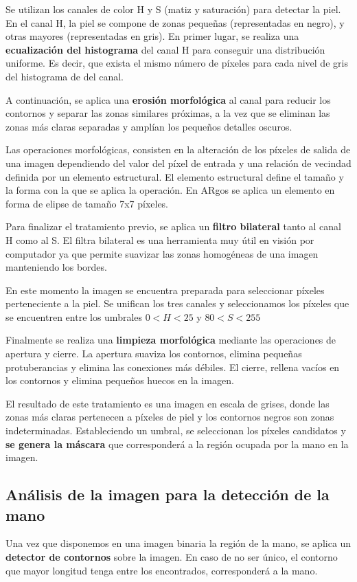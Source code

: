Se utilizan los canales de color H y S (matiz y saturación) para
detectar la piel. En el canal H, la piel se compone de zonas pequeñas
(representadas en negro), y otras mayores (representadas en gris). En
primer lugar, se realiza una \textbf{ecualización del histograma} del canal H
para conseguir una distribución uniforme. Es decir, que exista el
mismo número de píxeles para cada nivel de gris del histograma de del
canal.

A continuación, se aplica una \textbf{erosión morfológica} al canal para reducir los
contornos y separar las zonas similares próximas, a la vez que se
eliminan las zonas más claras separadas y amplían los pequeños detalles
oscuros.

Las operaciones morfológicas, consisten en la alteración de los píxeles
de salida de una imagen dependiendo del valor del píxel de entrada y
una relación de vecindad definida por un elemento estructural. El
elemento estructural define el tamaño y la forma con la que se aplica
la operación. En ARgos se aplica un elemento en forma de elipse de
tamaño 7x7 píxeles.

Para finalizar el tratamiento previo, se aplica un \textbf{filtro bilateral}
tanto al canal H como al S. El filtra bilateral es una herramienta muy
útil en visión por computador ya que permite suavizar las zonas
homogéneas de una imagen manteniendo los bordes.

En este momento la imagen se encuentra preparada para seleccionar
píxeles perteneciente a la piel. Se unifican los tres canales y
seleccionamos los píxeles que se encuentren entre los umbrales
$0 < H < 25$ y $80 < S < 255$

Finalmente se realiza una \textbf{limpieza morfológica} mediante las operaciones de
apertura y cierre. La apertura suaviza los contornos, elimina pequeñas
protuberancias y elimina las conexiones más débiles. El cierre,
rellena vacíos en los contornos y elimina pequeños huecos en la
imagen.

El resultado de este tratamiento es una imagen en escala de grises,
donde las zonas más claras pertenecen a píxeles de piel y los
contornos negros son zonas indeterminadas. Estableciendo un umbral, se
seleccionan los píxeles candidatos y \textbf{se genera la máscara} que
corresponderá a la región ocupada por la mano en la imagen.

\subsection{Análisis de la imagen para la detección de la mano}
Una vez que disponemos en una imagen binaria la región de la mano,
se aplica un \textbf{detector de contornos} sobre la imagen. En caso de no ser
único, el contorno que mayor longitud tenga entre los encontrados, corresponderá
a la mano.

